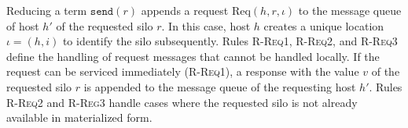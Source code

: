 \documentclass[preprint]{sigplanconf}
\theoremstyle{definition}
\theoremstyle{definition}
\begin{document}
Reducing a term $\texttt{send}(r)$ appends a request $\text{Req}(h, r, \iota)$
to the message queue of host $h'$ of the requested silo $r$. In this case, host
$h$ creates a unique location $\iota = (h, i)$ to identify the silo
subsequently. Rules \textsc{R-Req1}, \textsc{R-Req2}, and \textsc{R-Req3}
define the handling of request messages that cannot be handled locally. If the
request can be serviced immediately (\textsc{R-Req1}), a response with the
value $v$ of the requested silo $r$ is appended to the message queue of the
requesting host $h'$. Rules \textsc{R-Req2} and \textsc{R-Reg3} handle cases
where the requested silo is not already available in materialized form.

\end{document}
